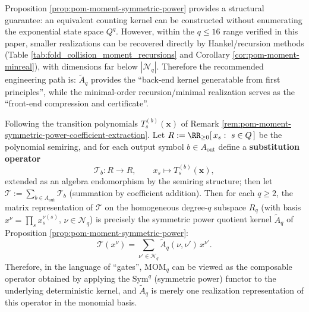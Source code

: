 \begin{remark}\label{rem:pom-moment-symmetric-power-impl}
Proposition \ref{prop:pom-moment-symmetric-power} provides a structural guarantee: an equivalent counting kernel can be constructed without enumerating the exponential state space \(Q^q\).
However, within the \(q\le 16\) range verified in this paper, smaller realizations can be recovered directly by Hankel/recursion methods (Table \ref{tab:fold_collision_moment_recursions} and Corollary \ref{cor:pom-moment-minreal}), with dimensions far below \(|\mathcal{N}_q|\).
Therefore the recommended engineering path is: \(\widetilde A_q\) provides the ``back-end kernel generatable from first principles'', while the minimal-order recursion/minimal realization serves as the ``front-end compression and certificate''.
\end{remark}
\begin{remark}\label{rem:pom-moment-symmetric-power-substitution-operator}
Following the transition polynomials \(T^{(b)}_s(\mathbf{x})\) of Remark \ref{rem:pom-moment-symmetric-power-coefficient-extraction}.
Let \(R:=\RR_{\ge 0}[\,x_s:\ s\in Q\,]\) be the polynomial semiring, and for each output symbol \(b\in A_{\mathrm{out}}\) define a \textbf{substitution operator}
\[
\mathcal{T}_b:R\to R,\qquad
x_s\longmapsto T^{(b)}_s(\mathbf{x}),
\]
extended as an algebra endomorphism by the semiring structure; then let \(\mathcal{T}:=\sum_{b\in A_{\mathrm{out}}}\mathcal{T}_b\) (summation by coefficient addition).
Then for each \(q\ge 2\), the matrix representation of \(\mathcal{T}\) on the homogeneous degree-\(q\) subspace \(R_q\) (with basis \(x^\nu=\prod_s x_s^{\nu(s)}\), \(\nu\in\mathcal{N}_q\)) is precisely the symmetric power quotient kernel \(\widetilde A_q\) of Proposition \ref{prop:pom-moment-symmetric-power}:
\[
\mathcal{T}(x^\nu)=\sum_{\nu'\in\mathcal{N}_q}\widetilde A_q(\nu,\nu')\,x^{\nu'}.
\]
Therefore, in the language of ``gates'', \(\mathrm{MOM}_q\) can be viewed as the composable operator obtained by applying the \(\mathrm{Sym}^q\) (symmetric power) functor to the underlying deterministic kernel, and \(\widetilde A_q\) is merely one realization representation of this operator in the monomial basis.
\end{remark}
